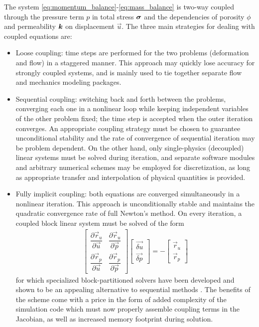 The system \eqref{eq:momentum_balance}-\eqref{eq:mass_balance} is two-way coupled through the pressure term $p$ in total stress $\bm{\sigma}$ and the dependencies of porosity $\phi$ and permeability $\bm{k}$ on displacement $\vec{u}$.   The three main strategies for dealing with coupled equations are:
\begin{itemize}
    \item Loose coupling: time steps are performed for the two problems (deformation and flow) in a staggered manner.   This approach may quickly lose accuracy for strongly coupled systems, and is mainly used to tie together separate flow and mechanics modeling packages. 
    \item Sequential coupling: switching back and forth between the problems, converging each one in a nonlinear loop while keeping independent variables of the other problem fixed; the time step is accepted when the outer iteration converges.   An appropriate coupling strategy must be chosen to guarantee unconditional stability \cite{Kim2011a,Kim2011b,Castelletto2015} and the rate of convergence of sequential iteration may be problem dependent.   On the other hand, only single-physics (decoupled) linear systems must be solved during iteration, and separate software modules and arbitrary numerical schemes may be employed for discretization, as long as appropriate transfer and interpolation of physical quantities is provided.
    \item Fully implicit coupling: both equations are converged simultaneously in a nonlinear iteration.   This approach is unconditionally stable and maintains the quadratic convergence rate of full Newton's method.   On every iteration, a coupled block linear system must be solved of the form
    \begin{align}
        \begin{bmatrix}
        \dfrac{\partial \vec{r}_u}{\partial \vec{u}} & \dfrac{\partial \vec{r}_u}{\partial \vec{p}} \\
        \dfrac{\partial \vec{r}_p}{\partial \vec{u}} & \dfrac{\partial \vec{r}_p}{\partial \vec{p}}
        \end{bmatrix}
        \begin{bmatrix}
            \vec{\delta u} \\
            \vec{\delta p}
        \end{bmatrix} = -
        \begin{bmatrix}
            \vec{r}_u \\
            \vec{r}_p
        \end{bmatrix}
    \end{align}
    for which specialized block-partitioned solvers have been developed and shown to be an appealing alternative to sequential methods \cite{White2015,White2019}.   The benefits of the scheme come with a price in the form of added complexity of the simulation code which must now properly assemble coupling terms in the Jacobian, as well as increased memory footprint during solution.
\end{itemize}

